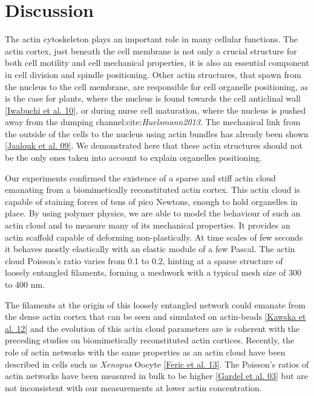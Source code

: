 \documentclass[A4paperpaper,11pt,english]{sphinxmanual}
\begin{document}
\section{Discussion}
\label{parts/part3:discussion}
The actin cytoskeleton plays an important role in many cellular functions.  The
actin cortex, just beneath the cell membrane is not only a crucial structure
for both cell motility and cell mechanical properties, it is also an essential
component in cell division and spindle positioning.  Other actin structures,
that spawn from the nucleus to the cell membrane, are responsible for cell
organelle positioning, as is the case for plants, where the nucleus is found
towards the cell anticlinal wall {\hyperref[parts/part3:iwabuchi2010]{{[}Iwabuchi et al. 10{]}}}, or during nurse cell
maturation, where the nucleus is pushed away from the dumping
channel:cite:\emph{Huelsmann2013}. The mechanical link from the outside of the cells
to the nucleus using actin bundles has already been shown {\hyperref[parts/part3:jaalouk2009]{{[}Jaalouk et al. 09{]}}}.
We demonstrated here that these actin structures should not be the only ones
taken into account to explain organelles positioning.

Our experiments confirmed the existence of a sparse and stiff actin cloud emanating
from a biomimetically reconstituted actin cortex.  This actin cloud is capable
of staining forces of tens of pico Newtons, enough to hold organelles in place. By using polymer physics,
we are able to model the behaviour of such an actin cloud and
to measure many of its mechanical properties. It provides an
actin scaffold capable of deforming non-plastically. At time scales of few
seconds it behaves mostly elastically with an elastic module of a few Pascal.
The actin cloud Poisson’s ratio varies from 0.1 to 0.2, hinting at a
sparse structure of loosely entangled filaments, forming a meshwork with a
typical mesh size of 300 to 400 nm.

The filaments at the origin of this loosely entangled network could emanate
from the dense actin cortex that can be seen and simulated on actin-beads
{\hyperref[parts/part3:kawska2012]{{[}Kawska et al. 12{]}}} and the evolution of this actin cloud parameters are is
coherent with the preceding studies on biomimetically reconstituted actin
cortices. Recently, the role of actin networks with the same properties as an
actin cloud have been described in cells such as \emph{Xenopus} Oocyte
{\hyperref[parts/part3:feric2013]{{[}Feric et al. 13{]}}}. The Poisson’s ratios of actin networks have been measured in
bulk to be higher {\hyperref[parts/part3:gardel2003]{{[}Gardel et al. 03{]}}} but are not inconsistent with our
measurements at lower actin concentration.
\end{document}
